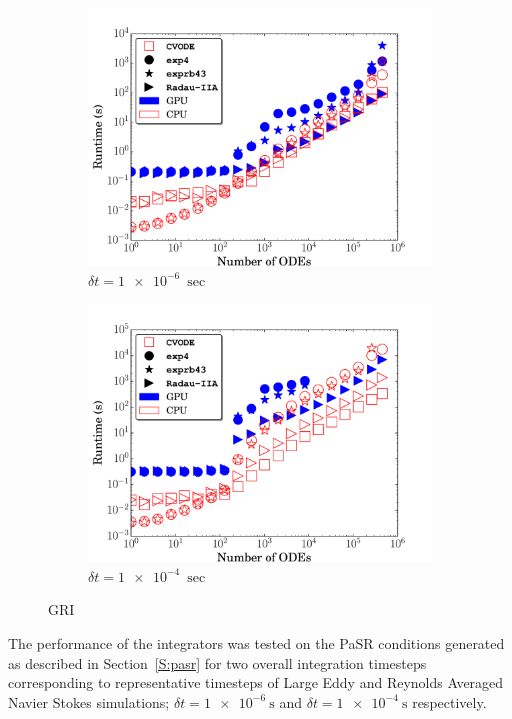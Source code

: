 \documentclass[preprint,12pt]{elsarticle}
\begin{document}
\begin{figure}
  \centering
  \begin{subfigure}{0.48\textwidth}
      \includegraphics[width=\linewidth]{GRI_1e-06_cpuvsgpu.pdf}
      \caption{$\delta t = \SI{1e-6}{\sec}$}
  \end{subfigure}
  \hfill
  \begin{subfigure}{0.48\textwidth}
      \includegraphics[width=\linewidth]{GRI_1e-04_cpuvsgpu.pdf}
      \caption{$\delta t = \SI{1e-4}{\sec}$}
  \end{subfigure}
  \caption{GRI}
  \label{F:GRI_perf}
\end{figure}
The performance of the integrators was tested on the PaSR conditions generated as described in Section~\ref{S:pasr} for two overall integration timesteps corresponding to representative timesteps of Large Eddy and Reynolds Averaged Navier Stokes simulations; $\delta t = \SI{1e-6}{\s}$ and $\delta t = \SI{1e-4}{\s}$ respectively.
\end{document}
